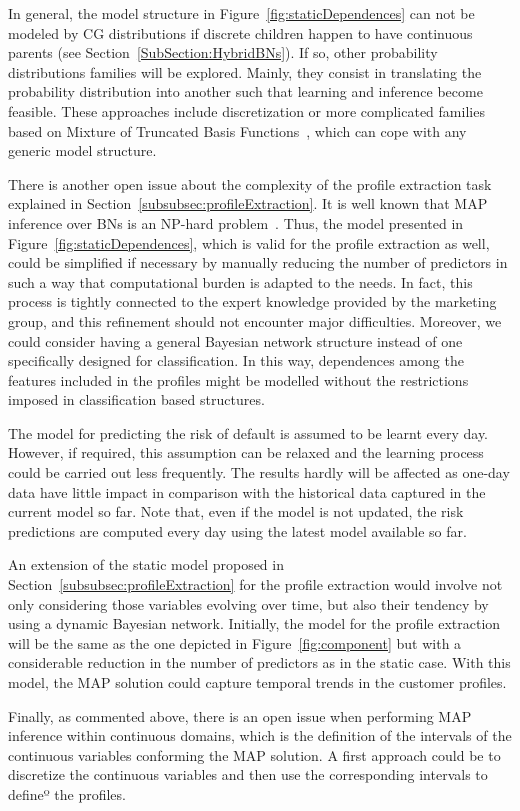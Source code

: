 In general, the model structure in Figure~\ref{fig:staticDependences} can not be modeled by CG distributions if discrete children happen to have continuous parents (see Section~\ref{SubSection:HybridBNs}). If so, other probability distributions families will be explored. Mainly, they consist in translating the probability distribution into another such that learning and inference become feasible. These approaches include discretization or more complicated families based on Mixture of Truncated Basis Functions~\cite{Langseth12}, which can cope with any generic model structure.

There is another open issue about the complexity of the profile extraction task explained in Section~\ref{subsubsec:profileExtraction}. It is well known that MAP inference over BNs is an NP-hard problem~\cite{Shi94}. Thus, the model presented in Figure~\ref{fig:staticDependences}, which is valid for the profile extraction as well, could be simplified if necessary by manually reducing the number of predictors in such a way that computational burden is adapted to the needs. In fact, this process is tightly connected to the expert knowledge provided by the marketing group, and this refinement should not encounter major difficulties. Moreover, we could consider having a general Bayesian network structure instead of one specifically designed for classification. In this way, dependences among the features included in the profiles might be modelled without the restrictions imposed in classification based structures.

The model for predicting the risk of default is assumed to be learnt every day. However, if required, this assumption can be relaxed and the learning process could be carried out less frequently. The results hardly will be affected as one-day data have little impact in comparison with the historical data captured in the current model so far. Note that, even if the model is not updated, the risk predictions are computed every day using the latest model available so far.

An extension of the static model proposed in Section~\ref{subsubsec:profileExtraction} for the profile extraction would involve not only considering those variables evolving over time, but also their tendency by using a dynamic Bayesian network. Initially, the model for the profile extraction will be the same as the one depicted in Figure~\ref{fig:component} but with a considerable reduction in the number of predictors as in the static case. With this model, the MAP solution could capture temporal trends in the customer profiles. 

Finally, as commented above, there is an open issue when performing MAP inference within continuous domains, which is the definition of the intervals of the continuous variables conforming the MAP solution. A first approach could be to discretize the continuous variables and then use the corresponding intervals to defineº the profiles. 






